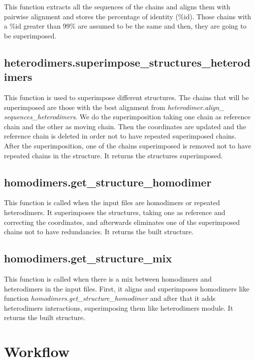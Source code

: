 \documentclass[a4paper,10pt]{report}
\begin{document}
This function extracts all the sequences of the chains and aligns them with pairwise alignment and stores the percentage of identity (\%id). Those chains with a \%id greater than 99\% are assumed to be the same and then, they are going to be superimposed. 

\subsection{heterodimers.superimpose\_structures\_heterodimers}

This function is used to superimpose different structures. The chains that will be superimposed are those with the best alignment from \textit{heterodimer.align\_\\sequences\_heterodimers}. 
We do the superimposition taking one chain as reference chain and the other as moving chain. Then the coordinates are updated and the reference chain is deleted in order not to have repeated superimposed chains. 
After the superimposition, one of the chains superimposed is removed not to have repeated chains in the structure. It returns the structures superimposed.

\subsection{homodimers.get\_structure\_homodimer}

This function is called when the input files are homodimers or repeated heterodimers. It superimposes the structures, taking one as reference and correcting the coordinates, and afterwards eliminates one of the superimposed chains not to have redundancies. It returns the built structure.

\subsection{homodimers.get\_structure\_mix}

This function is called when there is a mix between homodimers and heterodimers in the input files. First, it aligns and superimposes homodimers like function \textit{homodimers.get\_structure\_homodimer} and after that it adds heterodimers interactions, superimposing them like heterodimers module. It returns the built structure.


\section{Workflow}
\end{document}
